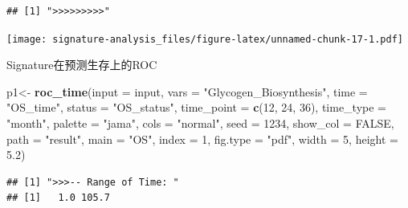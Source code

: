 \documentclass[
  12pt,
]{book}
\newenvironment{Shaded}{\begin{snugshade}}{\end{snugshade}}
\newcommand{\AttributeTok}[1]{\textcolor[rgb]{0.13,0.29,0.53}{#1}}
\newcommand{\ConstantTok}[1]{\textcolor[rgb]{0.56,0.35,0.01}{#1}}
\newcommand{\DecValTok}[1]{\textcolor[rgb]{0.00,0.00,0.81}{#1}}
\newcommand{\FloatTok}[1]{\textcolor[rgb]{0.00,0.00,0.81}{#1}}
\newcommand{\FunctionTok}[1]{\textcolor[rgb]{0.13,0.29,0.53}{\textbf{#1}}}
\newcommand{\NormalTok}[1]{#1}
\newcommand{\OtherTok}[1]{\textcolor[rgb]{0.56,0.35,0.01}{#1}}
\newcommand{\SpecialCharTok}[1]{\textcolor[rgb]{0.81,0.36,0.00}{\textbf{#1}}}
\newcommand{\StringTok}[1]{\textcolor[rgb]{0.31,0.60,0.02}{#1}}
\begin{document}
\begin{verbatim}
## [1] ">>>>>>>>>"
\end{verbatim}

\begin{Shaded}
\end{Shaded}

\texttt{[image: signature-analysis\_files/figure-latex/unnamed-chunk-17-1.pdf]}

Signature在预测生存上的ROC

\begin{Shaded}
\begin{Highlighting}[]
\NormalTok{p1}\OtherTok{\textless{}{-}} \FunctionTok{roc\_time}\NormalTok{(}\AttributeTok{input      =}\NormalTok{ input,  }
             \AttributeTok{vars       =} \StringTok{"Glycogen\_Biosynthesis"}\NormalTok{, }
             \AttributeTok{time       =} \StringTok{"OS\_time"}\NormalTok{,}
             \AttributeTok{status     =} \StringTok{"OS\_status"}\NormalTok{, }
             \AttributeTok{time\_point =} \FunctionTok{c}\NormalTok{(}\DecValTok{12}\NormalTok{, }\DecValTok{24}\NormalTok{, }\DecValTok{36}\NormalTok{), }
             \AttributeTok{time\_type  =} \StringTok{"month"}\NormalTok{,}
             \AttributeTok{palette    =} \StringTok{"jama"}\NormalTok{,}
             \AttributeTok{cols       =} \StringTok{"normal"}\NormalTok{,}
             \AttributeTok{seed       =} \DecValTok{1234}\NormalTok{, }
             \AttributeTok{show\_col   =} \ConstantTok{FALSE}\NormalTok{, }
             \AttributeTok{path       =} \StringTok{"result"}\NormalTok{, }
             \AttributeTok{main       =} \StringTok{"OS"}\NormalTok{,}
             \AttributeTok{index      =} \DecValTok{1}\NormalTok{,}
             \AttributeTok{fig.type   =} \StringTok{"pdf"}\NormalTok{,}
             \AttributeTok{width      =} \DecValTok{5}\NormalTok{,}
             \AttributeTok{height     =} \FloatTok{5.2}\NormalTok{)}
\end{Highlighting}
\end{Shaded}

\begin{verbatim}
## [1] ">>>-- Range of Time: "
## [1]   1.0 105.7
\end{verbatim}
\end{document}
